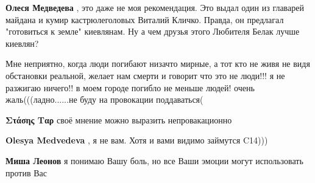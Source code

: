 \begin{itemize}
\begin{itemize}
 
\textbf{Олеся Медведева} , это даже не моя рекомендация. Это выдал один из
главарей майдана и кумир кастрюлеголовых Виталий Кличко. Правда, он предлагал
"готовиться к земле" киевлянам. Ну а чем друзья этого Любителя Белак лучше
киевлян?

 

Мне неприятно, когда люди погибают низачто мирные, а тот кто не живя не видя
обстановки реальной, желает нам смерти и говорит что это не люди!!! я не разжигаю
ничего!! в моем городе погибло не меньше людей! очень жаль(((ладно......не буду на
провокации поддаваться(

 
\textbf{Στάσης Ταρ} своё мнение можно выразить непровакационно

 
\textbf{Olesya Medvedeva} , я не вам. Хотя и вами видимо займутся C14)))

 
\textbf{Миша Леонов} я понимаю Вашу боль, но все Ваши эмоции могут использовать против Вас

 

\end{itemize}
\end{itemize}
